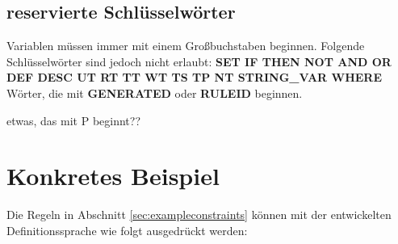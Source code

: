 \subsection{reservierte Schlüsselwörter}
\label{sec:keywords}
Variablen müssen immer mit einem Großbuchstaben beginnen. Folgende Schlüsselwörter sind jedoch nicht erlaubt:
 \textbf{SET IF THEN NOT AND OR DEF DESC UT RT TT WT TS TP NT STRING\_VAR WHERE}\\
Wörter, die mit \textbf{GENERATED} oder \textbf{RULEID} beginnen.

etwas, das mit P beginnt??

%
%
\section{Konkretes Beispiel}
Die Regeln in Abschnitt \ref{sec:exampleconstraints}  können mit der entwickelten Definitionssprache wie folgt ausgedrückt werden:\\
\small
